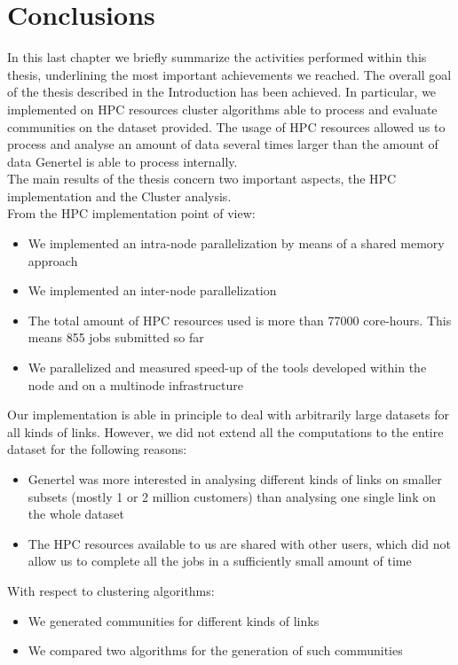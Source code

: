 \documentclass[a4paper,11pt]{book}
\begin{document}
\chapter{Conclusions}
In this last chapter we briefly summarize the activities performed within this thesis, underlining the most important achievements we reached. The overall goal of the thesis described in the Introduction has been achieved. In particular, we implemented on HPC resources cluster algorithms able to process and evaluate communities on the dataset provided. The usage of HPC resources allowed us to process and analyse an amount of data several times larger than the amount of data Genertel is able to process internally.\\

The main results of the thesis concern two important aspects, the HPC implementation and the Cluster analysis.\\

From the HPC implementation point of view:
\begin{itemize}
\item We implemented an intra-node parallelization by means of a shared memory approach
\item We implemented an inter-node parallelization
\item The total amount of HPC resources used is more than 77000 core-hours. This means 855 jobs submitted so far
\item We parallelized and measured speed-up of the tools developed within the node and on a multinode infrastructure
\end{itemize}
Our implementation is able in principle to deal with arbitrarily large datasets for all kinds of links. However, we did not extend all the computations to the entire dataset for the following reasons:
\begin{itemize}
\item Genertel was more interested in analysing different kinds of links on smaller subsets (mostly 1 or 2 million customers) than analysing one single link on the whole dataset
\item The HPC resources available to us are shared with other users, which did not allow us to complete all the jobs in a sufficiently small amount of time
\end{itemize}
With respect to clustering algorithms:
\begin{itemize}
\item We generated communities for different kinds of links 
\item We compared two algorithms for the generation of such communities
\end{itemize}
\end{document}
